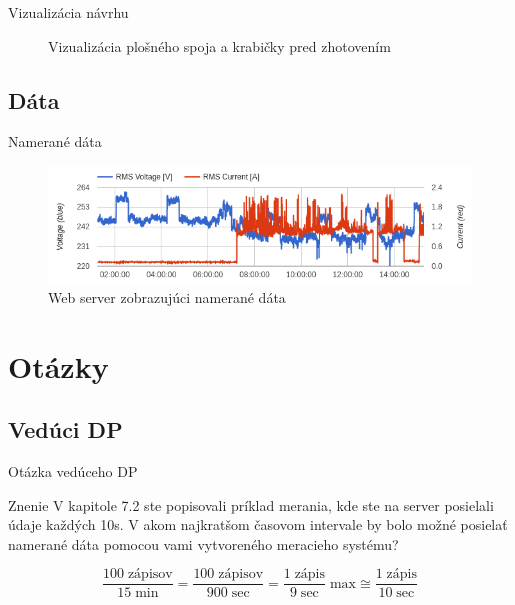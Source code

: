 \documentclass[hyperref={unicode}]{beamer}
\begin{document}
\begin{frame}{Vizualizácia návrhu}
\begin{figure}[htp]
		\caption{Vizualizácia plošného spoja a krabičky pred zhotovením}
	\end{figure}
\end{frame}



\subsection{Dáta}
\label{sub:Dáta}

\begin{frame}{Namerané dáta}
	\begin{figure}[htp]
		\centering
		\includegraphics[width=1\linewidth]{plot-preview}
		\caption{Web server zobrazujúci namerané dáta}
	\end{figure}
\end{frame}



\section{Otázky}
\label{sec:Otázky}

\subsection{Vedúci DP}
\label{sub:Vedúci}

\begin{frame}{Otázka vedúceho DP}
	\begin{block}{Znenie}
		V kapitole 7.2 ste popisovali príklad merania, kde ste na server posielali údaje každých 10s. V akom najkratšom časovom intervale by bolo možné posielať namerané dáta pomocou vami vytvoreného meracieho systému?
	\end{block}

	\begin{equation*}
		\frac{100\;\text{zápisov}}{15\;\text{min}} = \frac{100\;\text{zápisov}}{900\;\text{sec}} = \frac{1\;\text{zápis}}{9\;\text{sec}}\;\text{max} \cong \frac{1\;\text{zápis}}{10\;\text{sec}}
	\end{equation*}
\end{frame}
\end{document}
